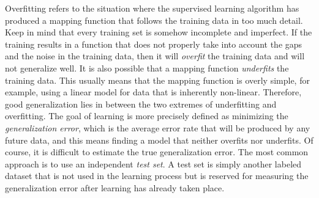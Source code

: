 
Overfitting refers to the situation where the supervised learning algorithm has produced a mapping function that follows the training data in too much detail. Keep in mind that every training set is somehow incomplete and imperfect. If the training results in a function that does not properly take into account the gaps and the noise in the training data, then it will \emph{overfit} the training data and will not generalize well. It is also possible that a mapping function \emph{underfits} the training data. This usually means that the mapping function is overly simple, for example, using a linear model for data that is inherently non-linear. Therefore, good generalization lies in between the two extremes of underfitting and overfitting. The goal of learning is more precisely defined as minimizing the \emph{generalization error}, which is the average error rate that will be produced by any future data, and this means finding a model that neither overfits nor underfits. Of course, it is difficult to estimate the true generalization error. The most common approach is to use an independent \emph{test set}. A test set is simply another labeled dataset that is not used in the learning process but is reserved for measuring the generalization error after learning has already taken place.

